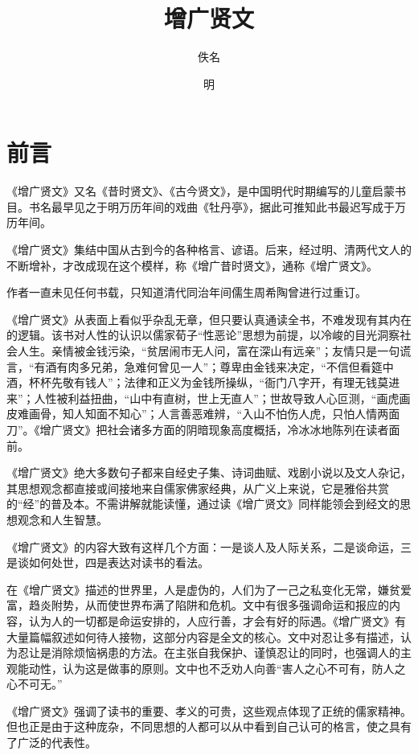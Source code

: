\documentclass[12pt,UTF8]{ctexbook}
\title{\heiti\zihao{0} 增广贤文}
\author{佚名}
\date{明}
\begin{document}
\maketitle
\tableofcontents

\frontmatter

\chapter{前言}

《增广贤文》又名《昔时贤文》、《古今贤文》，是中国明代时期编写的儿童启蒙书目。书名最早见之于明万历年间的戏曲《牡丹亭》，据此可推知此书最迟写成于万历年间。

《增广贤文》集结中国从古到今的各种格言、谚语。后来，经过明、清两代文人的不断增补，才改成现在这个模样，称《增广昔时贤文》，通称《增广贤文》。

作者一直未见任何书载，只知道清代同治年间儒生周希陶曾进行过重订。

《增广贤文》从表面上看似乎杂乱无章，但只要认真通读全书，不难发现有其内在的逻辑。该书对人性的认识以儒家荀子“性恶论”思想为前提，以冷峻的目光洞察社会人生。亲情被金钱污染，“贫居闹市无人问，富在深山有远亲”；友情只是一句谎言，“有酒有肉多兄弟，急难何曾见一人”；尊卑由金钱来决定，“不信但看筵中酒，杯杯先敬有钱人”；法律和正义为金钱所操纵，“衙门八字开，有理无钱莫进来”；人性被利益扭曲，“山中有直树，世上无直人”；世故导致人心叵测，“画虎画皮难画骨，知人知面不知心”；人言善恶难辨，“入山不怕伤人虎，只怕人情两面刀”。《增广贤文》把社会诸多方面的阴暗现象高度概括，冷冰冰地陈列在读者面前。

《增广贤文》绝大多数句子都来自经史子集、诗词曲赋、戏剧小说以及文人杂记，其思想观念都直接或间接地来自儒家佛家经典，从广义上来说，它是雅俗共赏的“经”的普及本。不需讲解就能读懂，通过读《增广贤文》同样能领会到经文的思想观念和人生智慧。

《增广贤文》的内容大致有这样几个方面：一是谈人及人际关系，二是谈命运，三是谈如何处世，四是表达对读书的看法。

在《增广贤文》描述的世界里，人是虚伪的，人们为了一己之私变化无常，嫌贫爱富，趋炎附势，从而使世界布满了陷阱和危机。文中有很多强调命运和报应的内容，认为人的一切都是命运安排的，人应行善，才会有好的际遇。《增广贤文》有大量篇幅叙述如何待人接物，这部分内容是全文的核心。文中对忍让多有描述，认为忍让是消除烦恼祸患的方法。在主张自我保护、谨慎忍让的同时，也强调人的主观能动性，认为这是做事的原则。文中也不乏劝人向善“害人之心不可有，防人之心不可无。”

《增广贤文》强调了读书的重要、孝义的可贵，这些观点体现了正统的儒家精神。但也正是由于这种庞杂，不同思想的人都可以从中看到自己认可的格言，使之具有了广泛的代表性。
\end{document}
